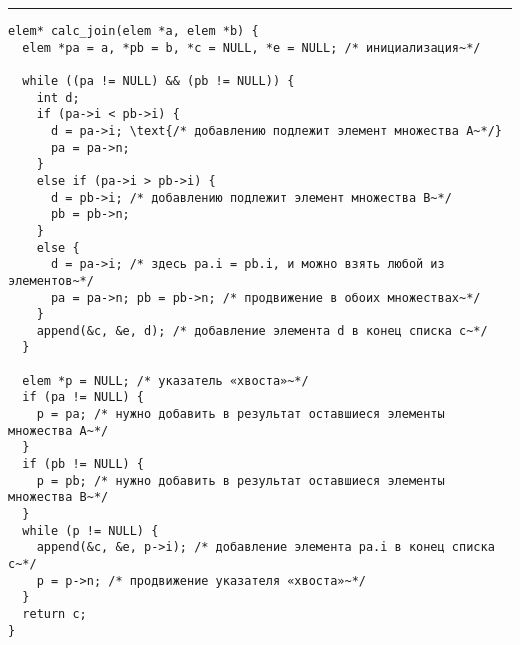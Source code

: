 \lstset{language = C,
    extendedchars = \true,
    keepspaces = true,
    breaklines=true,
    frame=lines}
\hrule
\begin{lstlisting}[title=\textbf {Алгоритм 1.5} Вычисление объединения слиянием]
elem* calc_join(elem *a, elem *b) {
  elem *pa = a, *pb = b, *c = NULL, *e = NULL; /* инициализация~*/

  while ((pa != NULL) && (pb != NULL)) {
    int d;
    if (pa->i < pb->i) {
      d = pa->i; \text{/* добавлению подлежит элемент множества А~*/}
      pa = pa->n;
    }
    else if (pa->i > pb->i) {
      d = pb->i; /* добавлению подлежит элемент множества В~*/
      pb = pb->n;
    }
    else {
      d = pa->i; /* здесь pa.i = pb.i, и можно взять любой из элементов~*/
      pa = pa->n; pb = pb->n; /* продвижение в обоих множествах~*/
    }
    append(&c, &e, d); /* добавление элемента d в конец списка с~*/
  }

  elem *p = NULL; /* указатель «хвоста»~*/
  if (pa != NULL) {
    p = pa; /* нужно добавить в результат оставшиеся элементы множества А~*/
  }
  if (pb != NULL) {
    p = pb; /* нужно добавить в результат оставшиеся элементы множества В~*/
  }
  while (p != NULL) {
    append(&c, &e, p->i); /* добавление элемента pa.i в конец списка с~*/
    p = p->n; /* продвижение указателя «хвоста»~*/
  }
  return c;
}
\end{lstlisting}
